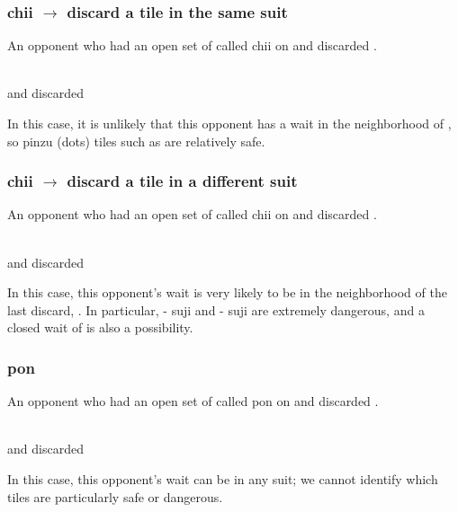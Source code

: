 {{\subsubsection*{ {\jap chii} $\rightarrow$ discard a tile in the same suit}
An opponent who had an open set of {\LARGE\fa} called {\jap chii} on {\LARGE{}} and discarded {\LARGE{}}. 
\begin{screen}
\bp
{}
~\rfa\fa\fa\\{\normalsize and discarded} 
\ep
\end{screen}
In this case, it is unlikely that this opponent has a wait in the neighborhood of {\LARGE{}}, so {\jap pinzu} (dots) tiles such as {\LARGE{}} are relatively safe. 

\subsubsection*{ {\jap chii} $\rightarrow$ discard a tile in a different suit}
An opponent who had an open set of {\LARGE\fa} called {\jap chii} on {\LARGE{}} and discarded {\LARGE{}}. 
\begin{screen}
\bp
{}
~\rfa\fa\fa\\{\normalsize and discarded} 
\ep
\end{screen}
In this case, this opponent's wait is very likely to be in the neighborhood of the last discard, {\LARGE{}}. In particular, {\LARGE{}-} {\jap suji} and {\LARGE{}-} {\jap suji} are extremely dangerous, and a closed wait of {\LARGE{}} is also a possibility.

\subsubsection*{ {\jap pon}}
An opponent who had an open set of {\LARGE\fa} called {\jap pon} on {\LARGE{}} and discarded {\LARGE{}}. 
\begin{screen}
\bp
{}
~\rfa\fa\fa\\{\normalsize and discarded} 
\ep
\end{screen}
In this case, this opponent's wait can be in any suit; we cannot identify which tiles are particularly safe or dangerous. 

}}
